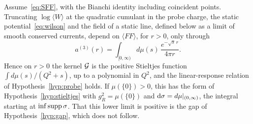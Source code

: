\begin{proposition}\label{prop:transport}
Assume~\eqref{eq:SFF}, with the Bianchi identity including coincident points.
Truncating $\log\langle W\rangle$ at the quadratic cumulant in the probe
charge, the static potential~\eqref{eq:wilson} and the field of a static
line, defined below as a limit of smooth conserved currents, depend on
$\langle FF\rangle$, for $r>0$, only through
\begin{equation}
a^{(3)}(r)=\int_{[0,\infty)}d\mu(s)\,\frac{e^{-\sqrt{s}\,r}}{4\pi r}.
\end{equation}
Hence on $r>0$ the kernel $\mathcal{G}$ is the positive Stieltjes function
$\int d\mu(s)/(Q^2+s)$, up to a polynomial in $Q^2$, and the linear-response
relation of Hypothesis~\ref{hyp:probe} holds. If $\mu(\{0\})>0$, this has the
form of Hypothesis~\ref{hyp:stieltjes} with $g_R^2=\mu(\{0\})$ and
$\mathrm{d}\sigma=d\mu|_{(0,\infty)}$, the integral starting at $\inf\operatorname{supp}\sigma$. That
this lower limit is positive is the gap of Hypothesis~\ref{hyp:gap}, which
does not follow.
\end{proposition}

